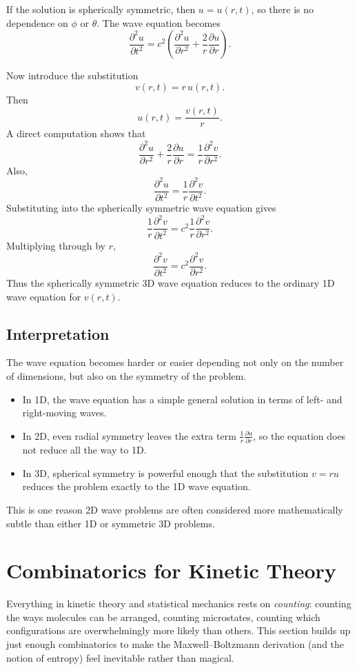 \documentclass{report}
\numberwithin{equation}{section}
\begin{document}
If the solution is spherically symmetric, then \(u=u(r,t)\), so there is no dependence on \(\phi\) or \(\theta\). The wave equation becomes
\[
\frac{\partial^2 u}{\partial t^2}
=
c^2
\left(
\frac{\partial^2 u}{\partial r^2}
+
\frac{2}{r}\frac{\partial u}{\partial r}
\right).
\]

Now introduce the substitution
\[
v(r,t)=r\,u(r,t).
\]
Then
\[
u(r,t)=\frac{v(r,t)}{r}.
\]
A direct computation shows that
\[
\frac{\partial^2 u}{\partial r^2}
+
\frac{2}{r}\frac{\partial u}{\partial r}
=
\frac{1}{r}\frac{\partial^2 v}{\partial r^2}.
\]
Also,
\[
\frac{\partial^2 u}{\partial t^2}
=
\frac{1}{r}\frac{\partial^2 v}{\partial t^2}.
\]
Substituting into the spherically symmetric wave equation gives
\[
\frac{1}{r}\frac{\partial^2 v}{\partial t^2}
=
c^2
\frac{1}{r}\frac{\partial^2 v}{\partial r^2}.
\]
Multiplying through by \(r\),
\[
\frac{\partial^2 v}{\partial t^2}
=
c^2
\frac{\partial^2 v}{\partial r^2}.
\]
Thus the spherically symmetric 3D wave equation reduces to the ordinary 1D wave equation for \(v(r,t)\).

\subsection*{Interpretation}

The wave equation becomes harder or easier depending not only on the number of dimensions, but also on the symmetry of the problem.

\begin{itemize}
    \item In 1D, the wave equation has a simple general solution in terms of left- and right-moving waves.
    \item In 2D, even radial symmetry leaves the extra term \( \frac{1}{r}\frac{\partial u}{\partial r} \), so the equation does not reduce all the way to 1D.
    \item In 3D, spherical symmetry is powerful enough that the substitution \(v=ru\) reduces the problem exactly to the 1D wave equation.
\end{itemize}

This is one reason 2D wave problems are often considered more mathematically subtle than either 1D or symmetric 3D problems.

\section{Combinatorics for Kinetic Theory}
Everything in kinetic theory and statistical mechanics rests on \emph{counting}: counting the ways molecules can be arranged, counting microstates, counting which configurations are overwhelmingly more likely than others. This section builds up just enough combinatorics to make the Maxwell--Boltzmann derivation (and the notion of entropy) feel inevitable rather than magical.
\end{document}

